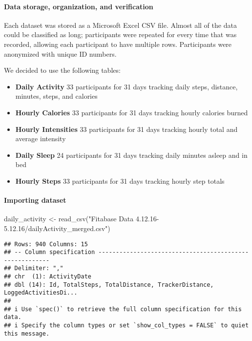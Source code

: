 \documentclass[
]{article}
\newenvironment{Shaded}{\begin{snugshade}}{\end{snugshade}}
\newcommand{\FunctionTok}[1]{\textcolor[rgb]{0.00,0.00,0.00}{#1}}
\newcommand{\NormalTok}[1]{#1}
\newcommand{\OtherTok}[1]{\textcolor[rgb]{0.56,0.35,0.01}{#1}}
\newcommand{\StringTok}[1]{\textcolor[rgb]{0.31,0.60,0.02}{#1}}
\providecommand{\tightlist}{%
  \setlength{\itemsep}{0pt}\setlength{\parskip}{0pt}}
\begin{document}
\hypertarget{data-storage-organization-and-verification}{%
\paragraph{Data storage, organization, and
verification}\label{data-storage-organization-and-verification}}

Each dataset was stored as a Microsoft Excel CSV file. Almost all of the
data could be classified as long; participants were repeated for every
time that was recorded, allowing each participant to have multiple rows.
Participants were anonymized with unique ID numbers.

We decided to use the following tables:

\begin{itemize}
\tightlist
\item
  \textbf{Daily Activity} 33 participants for 31 days tracking daily
  steps, distance, minutes, steps, and calories
\item
  \textbf{Hourly Calories} 33 participants for 31 days tracking hourly
  calories burned
\item
  \textbf{Hourly Intensities} 33 participants for 31 days tracking
  hourly total and average intensity
\item
  \textbf{Daily Sleep} 24 participants for 31 days tracking daily
  minutes asleep and in bed
\item
  \textbf{Hourly Steps} 33 participants for 31 days tracking hourly step
  totals
\end{itemize}

\hypertarget{importing-dataset}{%
\paragraph{Importing dataset}\label{importing-dataset}}

\begin{Shaded}
\begin{Highlighting}[]
\NormalTok{daily\_activity }\OtherTok{\textless{}{-}} \FunctionTok{read\_csv}\NormalTok{(}\StringTok{"Fitabase Data 4.12.16{-}5.12.16/dailyActivity\_merged.csv"}\NormalTok{)}
\end{Highlighting}
\end{Shaded}

\begin{verbatim}
## Rows: 940 Columns: 15
## -- Column specification --------------------------------------------------------
## Delimiter: ","
## chr  (1): ActivityDate
## dbl (14): Id, TotalSteps, TotalDistance, TrackerDistance, LoggedActivitiesDi...
## 
## i Use `spec()` to retrieve the full column specification for this data.
## i Specify the column types or set `show_col_types = FALSE` to quiet this message.
\end{verbatim}
\end{document}
